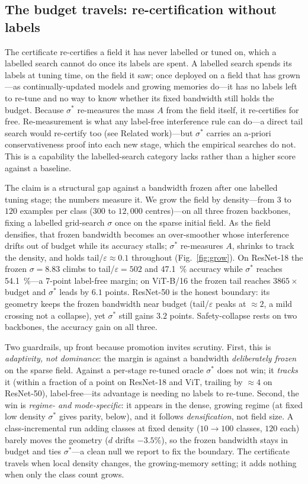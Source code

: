 \documentclass[10pt,twocolumn]{article}
\newcommand{\sstar}{\sigma^{*}}
\begin{document}
\subsection{The budget travels: re-certification without labels}\label{sec:grow}
The certificate re-certifies a field it has never labelled or tuned on, which a labelled search cannot do once its labels are spent. A labelled search spends its labels at tuning time, on the field it saw; once deployed on a field that has grown---as continually-updated models and growing memories do---it has no labels left to re-tune and no way to know whether its fixed bandwidth still holds the budget. Because $\sstar$ re-measures the mass $A$ from the field itself, it re-certifies for free. Re-measurement is what any label-free interference rule can do---a direct tail search would re-certify too (see Related work)---but $\sstar$ carries an a-priori conservativeness proof into each new stage, which the empirical searches do not. This is a capability the labelled-search category lacks rather than a higher score against a baseline.

The claim is a structural gap against a bandwidth frozen after one labelled tuning stage; the numbers measure it. We grow the field by density---from $3$ to $120$ examples per class ($300$ to $12{,}000$ centres)---on all three frozen backbones, fixing a labelled grid-search $\sigma$ once on the sparse initial field. As the field densifies, that frozen bandwidth becomes an over-smoother whose interference drifts out of budget while its accuracy stalls; $\sstar$ re-measures $A$, shrinks to track the density, and holds tail/$\varepsilon\!\approx\!0.1$ throughout (Fig.~\ref{fig:grow}). On ResNet-18 the frozen $\sigma=8.83$ climbs to tail/$\varepsilon=502$ and \SI{47.1}{\percent} accuracy while $\sstar$ reaches \SI{54.1}{\percent}---a $7$-point label-free margin; on ViT-B/16 the frozen tail reaches $3865\times$ budget and $\sstar$ leads by $6.1$ points. ResNet-50 is the honest boundary: its geometry keeps the frozen bandwidth near budget (tail/$\varepsilon$ peaks at $\approx\!2$, a mild crossing not a collapse), yet $\sstar$ still gains $3.2$ points. Safety-collapse rests on two backbones, the accuracy gain on all three.

Two guardrails, up front because promotion invites scrutiny. First, this is \emph{adaptivity, not dominance}: the margin is against a bandwidth \emph{deliberately frozen} on the sparse field. Against a per-stage re-tuned oracle $\sstar$ does not win; it \emph{tracks} it (within a fraction of a point on ResNet-18 and ViT, trailing by $\approx\!4$ on ResNet-50), label-free---its advantage is needing no labels to re-tune. Second, the win is \emph{regime- and mode-specific}: it appears in the dense, growing regime (at fixed low density $\sstar$ gives parity, below), and it follows \emph{densification}, not field size. A class-incremental run adding classes at fixed density ($10\!\to\!100$ classes, $120$ each) barely moves the geometry ($d$ drifts $-3.5\%$), so the frozen bandwidth stays in budget and ties $\sstar$---a clean null we report to fix the boundary. The certificate travels when local density changes, the growing-memory setting; it adds nothing when only the class count grows.
\end{document}

